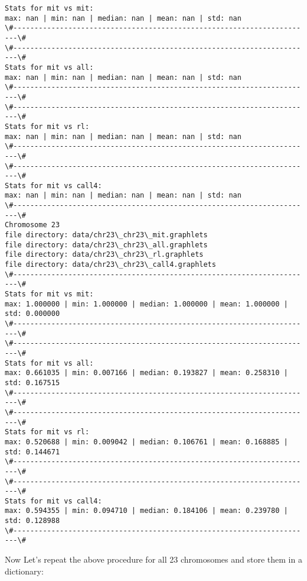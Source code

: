 \documentclass[11pt]{article}
\begin{document}
\begin{Verbatim}[commandchars=\\\{\}]
Stats for mit vs mit: 
max: nan | min: nan | median: nan | mean: nan | std: nan
\#-----------------------------------------------------------------------\#
\#-----------------------------------------------------------------------\#
Stats for mit vs all: 
max: nan | min: nan | median: nan | mean: nan | std: nan
\#-----------------------------------------------------------------------\#
\#-----------------------------------------------------------------------\#
Stats for mit vs rl: 
max: nan | min: nan | median: nan | mean: nan | std: nan
\#-----------------------------------------------------------------------\#
\#-----------------------------------------------------------------------\#
Stats for mit vs call4: 
max: nan | min: nan | median: nan | mean: nan | std: nan
\#-----------------------------------------------------------------------\#
Chromosome 23
file directory: data/chr23\_chr23\_mit.graphlets
file directory: data/chr23\_chr23\_all.graphlets
file directory: data/chr23\_chr23\_rl.graphlets
file directory: data/chr23\_chr23\_call4.graphlets
\#-----------------------------------------------------------------------\#
Stats for mit vs mit: 
max: 1.000000 | min: 1.000000 | median: 1.000000 | mean: 1.000000 | std: 0.000000
\#-----------------------------------------------------------------------\#
\#-----------------------------------------------------------------------\#
Stats for mit vs all: 
max: 0.661035 | min: 0.007166 | median: 0.193827 | mean: 0.258310 | std: 0.167515
\#-----------------------------------------------------------------------\#
\#-----------------------------------------------------------------------\#
Stats for mit vs rl: 
max: 0.520688 | min: 0.009042 | median: 0.106761 | mean: 0.168885 | std: 0.144671
\#-----------------------------------------------------------------------\#
\#-----------------------------------------------------------------------\#
Stats for mit vs call4: 
max: 0.594355 | min: 0.094710 | median: 0.184106 | mean: 0.239780 | std: 0.128988
\#-----------------------------------------------------------------------\#

    \end{Verbatim}

    Now Let's repeat the above procedure for all 23 chromosomes and store
them in a dictionary:
\end{document}
